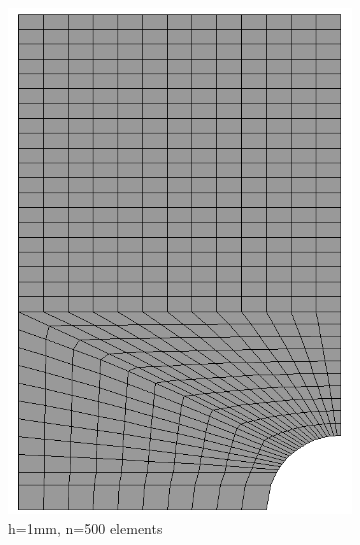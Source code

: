 \documentclass[a4paper,12pt,twoside]{report}
\begin{document}
\begin{figure}[htbp!]
     \captionsetup[subfigure]{justification=centering}
     \begin{subfigure}{0.27\textwidth}
         \includegraphics[width=1.15\textwidth]{25.1mm2.png}
         \caption{h=1mm, n=500 elements}
         \label{fig:1mm}
     \end{subfigure}
     \hfill
     \begin{subfigure}{0.27\textwidth}

\end{subfigure}
\end{figure}
\end{document}
